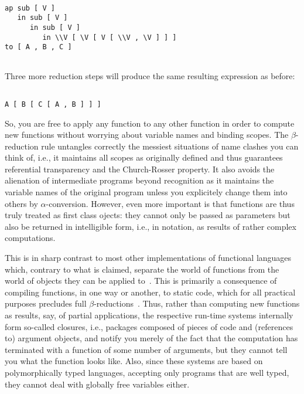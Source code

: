\begin{verbatim}

ap sub [ V ]
   in sub [ V ]
      in sub [ V ]
         in \\V [ \V [ V [ \\V , \V ] ] ]
to [ A , B , C ]


\end{verbatim}
Three more reduction steps will produce the same resulting expression as
before:
\begin{verbatim}

A [ B [ C [ A , B ] ] ]

\end{verbatim}
So, you are free to apply any function to any other function in order to
compute new functions without worrying about variable names and binding
 scopes. The $\beta$-reduction rule untangles correctly the messiest
situations of name clashes you can think of, i.e., it maintains all 
scopes as originally defined and thus guarantees {\mys 
referential transparency} and the {\mys Church-Rosser property}.
It also avoids the alienation of intermediate programs beyond recognition as
it maintains the variable names of the original
program unless you explicitely change them into others by $\alpha$-conversion.
However, even more important is that functions are thus truly treated as
first class ojects: they cannot only be passed as parameters but also be 
returned in intelligible form, i.e., in \kir notation, as results of
rather complex computations. 

This is in sharp contrast to most other implementations of functional
languages which, contrary to what is claimed, separate the world of
functions from the world of objects they can be applied to~\cite{burs80,harp86,turn85a,huda88}. This is
primarily a consequence of compiling functions, in one way or another, to
 static code, which for all practical purposes precludes full
$\beta$-reductions~\cite{augu84,john87,appe87}. Thus, rather than computing new functions as results, say, of
partial applications, the respective run-time systems internally form so-called
{\mys closures}, i.e., packages composed of pieces of code and (references to)
argument objects,
and notify  you merely of the fact that the computation has terminated
with a function of some number of arguments, but they cannot tell you
what the function looks like. Also, since these systems are based on
 {\mys polymorphically typed languages}, accepting only programs that
are well typed, they cannot deal with globally free variables either. 
 


